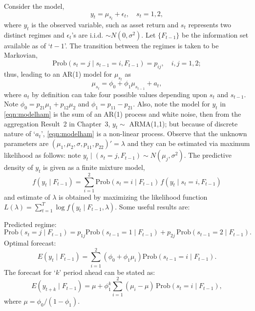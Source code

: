Consider the model,
	\begin{equation} \label{eqn:modelham}
	y_t = \mu_{s_t} + \epsilon_t, \quad s_t= 1, 2,
	\end{equation} 
where $y_t$ is the observed variable, such as asset return and $s_t$ represents two distinct regimes and $\epsilon_t$'s are i.i.d. $\sim N(0,\sigma^2)$. Let $\{ F_{t-1} \}$ be the information set available as of `$t-1$'. The transition between the regimes is taken to be Markovian,
	\begin{equation} \label{eqn:markprob}
	\text{Prob}(s_t= j \;|\; s_{t-1}= i, F_{t-1}) = p_{ij}, \quad i,j= 1, 2;
	\end{equation}
thus, leading to an AR(1) model for $\mu_{s_t}$ as
	\begin{equation} \label{eqn:must}
	\mu_{s_t} = \phi_0 + \phi_1 \mu_{s_{t-1}} + a_t,
	\end{equation}
where $a_t$ by definition can take four possible values depending upon $s_t$ and $s_{t-1}$. Note $\phi_0= p_{21} \mu_1 + p_{12} \mu_2$ and $\phi_1= p_{11} - p_{21}$. Also, note the model for $y_t$ in \eqref{eqn:modelham} is the sum of an AR(1) process and white noise, then from the aggregation Result~2 in Chapter~3, $y_t \sim$ ARMA(1,1); but because of discrete nature of `$a_t$', \eqref{eqn:modelham} is a non-linear process. Observe that the unknown parameters are $(\mu_1, \mu_2, \sigma,p_{11}, p_{22})'= \lambda$ and they can be estimated via maximum likelihood as follows: note $y_t \;|\; (s_t= j, F_{t-1}) \sim N(\mu_j,\sigma^2)$. The predictive density of $y_t$ is given as a finite mixture model,
	\begin{equation}\label{eqn:predden}
	f(y_t \;|\; F_{t-1})= \sum_{i=1}^2 \text{Prob}(s_t= i \;|\; F_{t-1}) \, f(y_t \;|\; s_t= i, F_{t-1})
	\end{equation}
and estimate of $\lambda$ is obtained by maximizing the likelihood function $L(\lambda)= \sum_{t=1}^T \log f(y_t \;|\; F_{t-1}, \lambda)$. Some useful results are: \twomedskip


\noindent Predicted regime: 
	\begin{equation} \label{eqn:predreg}
	\text{Prob}(s_t= j \;|\; F_{t-1})= p_{1j} \text{Prob}(s_{t-1}=1 \;|\; F_{t-1}) + p_{2j} \,\text{Prob}(s_{t-1}=2 \;|\; F_{t-1}).
	\end{equation}
\noindent Optimal forecast:
	\begin{equation} \label{eqn:optfore}
	E(y_t \;|\; F_{t-1})= \sum_{i=1}^2 (\phi_0+\phi_1 \mu_i) \text{Prob}(s_{t-1}=i \;|\; F_{t-1}).
	\end{equation}
The forecast for `$k$' period ahead can be stated as:
	\begin{equation} \label{eqn:period}
	E(y_{t+k} \;|\; F_{t-1}) = \mu+\phi_1^k \sum_{i=1}^2 (\mu_i-\mu)\, \text{Prob}(s_t=i \;|\; F_{t-1}),
	\end{equation}
where $\mu=\phi_0/(1-\phi_1)$.


